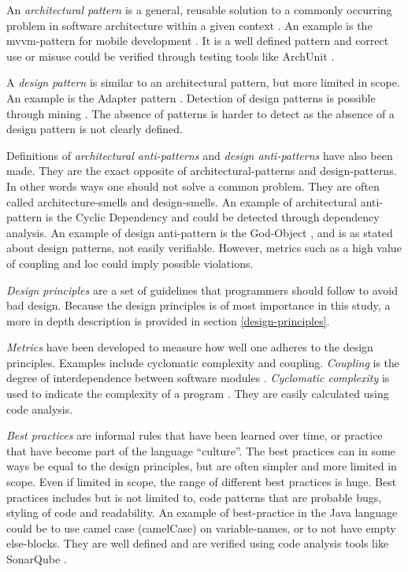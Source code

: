 \documentclass{report}
\begin{document}
An \textit{architectural pattern} is a general, reusable solution to a commonly occurring problem in software architecture within a given context \cite{architecturalpattern}. An example is the \gls{mvvm}-pattern for mobile development \cite{mvvm}. It is a well defined pattern and correct use or misuse could be verified through testing tools like ArchUnit \cite{archunit}. 

A \textit{design pattern} is similar to an architectural pattern, but more limited in scope. An example is the Adapter pattern \cite{Adapterp54:online}. Detection of design patterns is possible through mining \cite{TEKIN2014406}. The absence of patterns is harder to detect as the absence of a design pattern is not clearly defined.

Definitions of \textit{architectural anti-patterns} and \textit{design anti-patterns} have also been made. They are the exact opposite of architectural-patterns and design-patterns. In other words ways one should not solve a common problem. They are often called architecture-smells and design-smells. An example of architectural anti-pattern is the Cyclic Dependency \cite{cyclicdependency} and could be detected through dependency analysis. An example of design anti-pattern is the God-Object \cite{Godobjec14:online}, and is as stated about design patterns, not easily verifiable. However, metrics such as a high value of coupling and \gls{loc} could imply possible violations.


\textit{Design principles} are a set of guidelines that programmers should follow to avoid bad design. Because the design principles is of most importance in this study, a more in depth description is provided in section \ref{design-principles}.

\textit{Metrics} have been developed to measure how well one adheres to the design principles. Examples include cyclomatic complexity and coupling. \textit{Coupling} is the degree of interdependence between software modules \cite{Coupling2:online}. \textit{Cyclomatic complexity} is used to indicate the complexity of a program \cite{Cyclomat54:online}. They are easily calculated using code analysis.

\textit{Best practices} are informal rules that have been learned over time, or practice that have become part of the language ``culture''. The best practices can in some ways be equal to the design principles, but are often simpler and more limited in scope. Even if limited in scope, the range of different best practices is huge. Best practices includes but is not limited to, code patterns that are probable bugs, styling of code and readability. An example of best-practice in the Java language could be to use camel case (camelCase) \cite{camelcase} on variable-names, or to not have empty else-blocks. They are well defined and are verified using code analysis tools like SonarQube \cite{sonarqube}.
\end{document}
